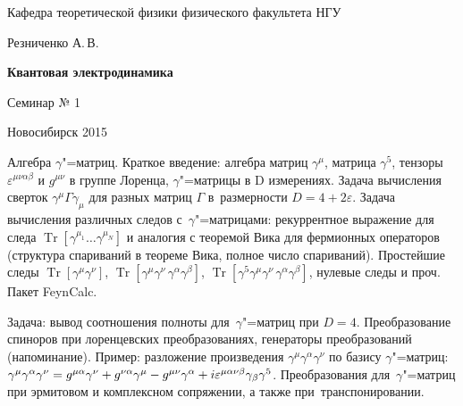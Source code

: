 \documentclass[12pt,pagesize,paper=landscape,paper=192mm:108mm]{scrbook}
\DeclareMathOperator{\Tr}{Tr}
\newcommand*{\hm}[1]{#1\nobreak\discretionary{}%
  {\hbox{$\mathsurround=0pt #1$}}{}}
\renewcommand{\epsilon}{\varepsilon}
\begin{document}
\begin{titlepage}
\begin{center}
    Кафедра теоретической физики физического факультета НГУ
    \medskip

    \Large
    Резниченко А.\,В.
    \bigskip

    \huge
    \textbf{Квантовая электродинамика}
    \bigskip

    \Large
    Семинар № 1
    \vfill

    \normalsize
    \vfill

    \normalsize \ccbysa\hspace{0.5em}  Новосибирск 2015
  \end{center}
\end{titlepage}
\newpage

\vspace*{-1em}
\begin{center}
\vfill
  \begin{minipage}{0.65\linewidth}
    Алгебра $\gamma$"=матриц.  Краткое введение: алгебра матриц
    $\gamma^{\mu}$, матрица $\gamma^5$, тензоры
    $\epsilon^{\mu\nu\alpha\beta}$ и $g^{\mu\nu}$ в группе Лоренца,
    $\gamma$"=матрицы в D измерениях.
    Задача вычисления сверток $\gamma^{\mu}\Gamma\gamma_{\mu}$ для
    разных матриц $\Gamma$ в~размерности $D=4+2\epsilon$.
    Задача вычисления различных следов с~$\gamma$"=матрицами:
    рекуррентное выражение для следа $\Tr[\gamma^{\mu_1}\ldots
    \gamma^{\mu_N}]$ и аналогия с теоремой Вика для фермионных
    операторов (структура спариваний в теореме Вика, полное число
    спариваний). Простейшие следы $\Tr[\gamma^{\mu}\gamma^{\nu}]$,
    $\Tr[\gamma^{\mu}\gamma^{\nu}\,\gamma^{\alpha}\gamma^{\beta}]$,
    $\Tr[\gamma^5\gamma^{\mu}\gamma^{\nu}\,\gamma^{\alpha}\gamma^{\beta}]$,
    нулевые следы и проч. Пакет FeynCalc.
    \smallskip

    Задача: вывод соотношения полноты для~$\gamma$"=матриц при
    $D=4$. Преобразование спиноров при лоренцевских преобразованиях,
    генераторы преобразований (напоминание). Пример: разложение
    произведения $\gamma^{\mu}\gamma^{\alpha}\gamma^{\nu}$ по базису
    $\gamma$"=матриц: $\gamma^{\mu}\gamma^{\alpha}\gamma^{\nu}=
    g^{\mu\alpha}\gamma^{\nu} + g^{\nu\alpha}\gamma^{\mu}\hm{-}
    g^{\mu\nu}\gamma^{\alpha}+ i \epsilon^{\mu\alpha\nu\beta}\gamma_{\beta}
    \gamma^5$.  
    Преобразования для~$\gamma$"=матриц при эрмитовом и комплексном
    сопряжении, а также при~транспонировании.
  \end{minipage}
  \vfill

\end{center}
\end{document}
